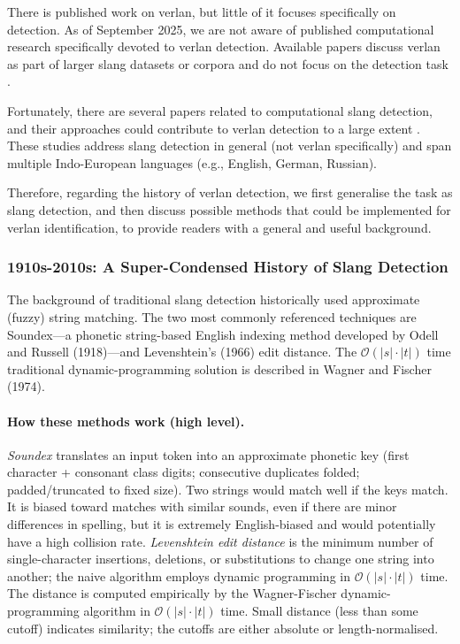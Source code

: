 \documentclass[12pt]{article}
\begin{document}
There is published work on verlan, but little of it focuses specifically on detection. As of September 2025, we are not aware of published computational research specifically devoted to verlan detection. Available papers discuss verlan as part of larger slang datasets or corpora and do not focus on the detection task \cite{zurbuchen2024, podhorna2020rapcor, mekki2021tremolo, panckhurst202088milsms}.

Fortunately, there are several papers related to computational slang detection, and their approaches could contribute to verlan detection to a large extent \cite{pei2019slang, sun2024informal, slangornot2024, wu2018slangsd}. These studies address slang detection in general (not verlan specifically) and span multiple Indo-European languages (e.g., English, German, Russian).

Therefore, regarding the history of verlan detection, we first generalise the task as slang detection, and then discuss possible methods that could be implemented for verlan identification, to provide readers with a general and useful background.

\subsubsection{1910s-2010s: A Super-Condensed History of Slang Detection}

The background of traditional slang detection historically used approximate (fuzzy) string matching. The two most commonly referenced techniques are Soundex\;---\;a phonetic string-based English indexing method developed by Odell and Russell (1918)\;---\;and Levenshtein's (1966) edit distance. The \( \mathcal{O}(|s|\cdot|t|) \) time traditional dynamic-programming solution is described in Wagner and Fischer (1974). \cite{russell1918soundex,levenshtein1966,wagner1974string}

\paragraph{How these methods work (high level).} \textit{Soundex} translates an input token into an approximate phonetic key (first character + consonant class digits; consecutive duplicates folded; padded/truncated to fixed size). Two strings would match well if the keys match. It is biased toward matches with similar sounds, even if there are minor differences in spelling, but it is extremely English-biased and would potentially have a high collision rate. \textit{Levenshtein edit distance} is the minimum number of single-character insertions, deletions, or substitutions to change one string into another; the naive algorithm employs dynamic programming in \( \mathcal{O}(|s|\cdot|t|) \) time. The distance is computed empirically by the Wagner-Fischer dynamic-programming algorithm in \( \mathcal{O}(|s|\cdot|t|) \) time. Small distance (less than some cutoff) indicates similarity; the cutoffs are either absolute or length-normalised. \cite{wagner1974string}
\end{document}
